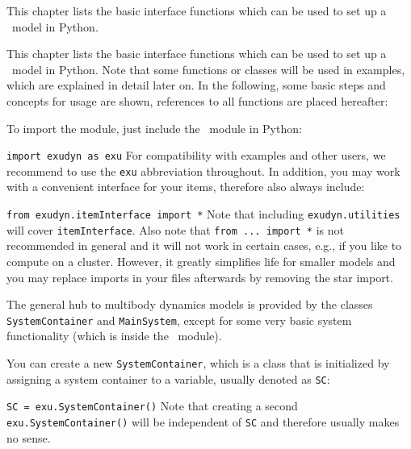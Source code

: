 
\label{sec:PCpp:command:interface}

This chapter lists the basic interface functions which can be used to set up a \codeName\ model in Python.

\label{sec:generalPythonInterface}
This chapter lists the basic interface functions which can be used to set up 
a \codeName\ model in Python. Note that some functions or classes will be used in examples, which are explained in detail later on.
In the following, some basic steps and concepts for usage are shown, references to all functions are placed hereafter:

To import the module, just include the \codeName\ module in Python:
\bi
  \item[] \texttt{import exudyn as exu}
\ei
For compatibility with examples and other users, we recommend to use the \texttt{exu} abbreviation throughout. In addition, you may work with a convenient interface for your items, therefore also always include:
\bi
  \item[] \texttt{from exudyn.itemInterface import *}
\ei
Note that including \texttt{exudyn.utilities} will cover \texttt{itemInterface}. Also note that \texttt{from ... import *} is not recommended in general and it will not work in certain cases, e.g., if you like to compute on a cluster. However, it greatly simplifies life for smaller models and you may replace imports in your files afterwards by removing the star import.

The general hub to multibody dynamics models is provided by the classes \texttt{SystemContainer} and \texttt{MainSystem}, except for some very basic system functionality (which is inside the \codeName\ module). 

You can create a new \texttt{SystemContainer}, which is a class that is initialized by assigning a system container to a variable, usually denoted as \texttt{SC}:
\bi
  \item[] \texttt{SC = exu.SystemContainer()}
\ei
Note that creating a second \texttt{exu.SystemContainer()} will be independent of \texttt{SC} and therefore usually makes no sense.

